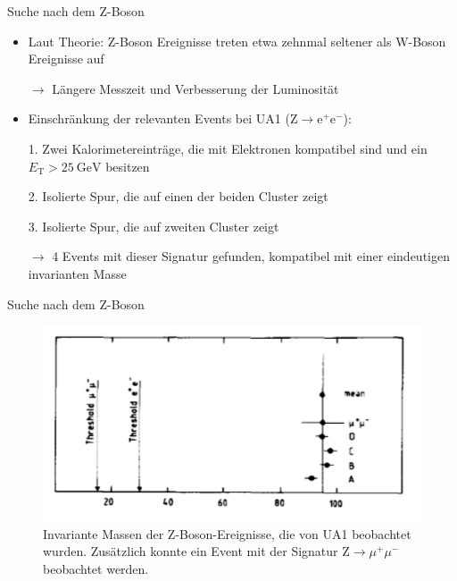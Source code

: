 \documentclass[aspectratio=1610, professionalfonts, 10pt]{beamer}
\begin{document}
\begin{frame}{Suche nach dem Z-Boson}
			\begin{itemize}
				\setlength\itemsep{0.5em}
				\item Laut Theorie: Z-Boson Ereignisse treten etwa zehnmal seltener als W-Boson Ereignisse auf
				\item[$\rightarrow$] Längere Messzeit und Verbesserung der Luminosität
				\item Einschränkung der relevanten Events bei UA1 ($\text{Z} \rightarrow \text{e}^+ \text{e}^-$):
				\item[1.] Zwei Kalorimetereinträge, die mit Elektronen kompatibel sind und ein $E_\text{T} > \SI{25}{\giga\electronvolt}$ besitzen
				\item[2.] Isolierte Spur, die auf einen der beiden Cluster zeigt
				\item[3.] Isolierte Spur, die auf zweiten Cluster zeigt
				\item[$\rightarrow$] 4 Events mit dieser Signatur gefunden, kompatibel mit einer eindeutigen invarianten Masse
			\end{itemize}
\end{frame}


\begin{frame}{Suche nach dem Z-Boson}
			\begin{figure}
	  			\centering
				\includegraphics[width=0.85\linewidth]{Images/Screenshot_2018-12-05_15-29-02.png}
				\caption{Invariante Massen der Z-Boson-Ereignisse, die von UA1 beobachtet wurden. \cite{doi:10.1142/9789814644150_0006} Zusätzlich konnte ein Event mit der Signatur $\text{Z} \rightarrow \mu^+ \mu^-$ beobachtet werden.}
	  			\label{fig:sad}
			\end{figure}
\end{frame}
\end{document}
